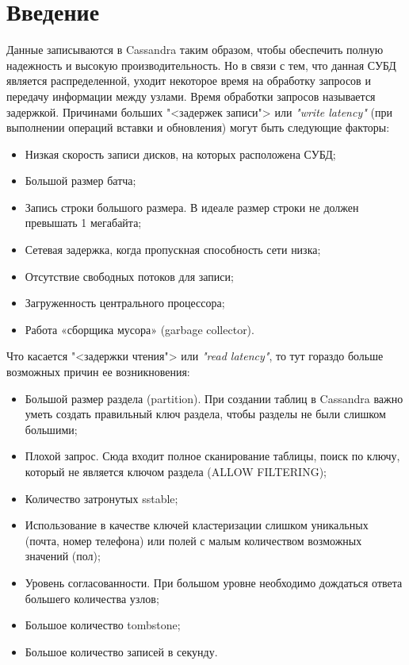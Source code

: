 \graphicspath{{img}} %
\section*{\LARGE Введение}

Данные записываются в Cassandra таким образом, чтобы обеспечить
полную надежность и высокую производительность. Но в связи с тем, что данная
СУБД является распределенной, уходит некоторое время на обработку запросов
и передачу информации между узлами. Время обработки запросов называется
задержкой. Причинами больших "<задержек записи"> или \textit{"write latency"}
(при выполнении операций вставки и обновления) могут быть следующие факторы:

\begin{itemize}
	\item Низкая скорость записи дисков, на которых расположена СУБД;
	\item Большой размер батча;
	\item Запись строки большого размера. В идеале размер строки не должен
	превышать 1 мегабайта;
	\item Сетевая задержка, когда пропускная способность сети низка;
	\item Отсутствие свободных потоков для записи;
	\item Загруженность центрального процессора;
	\item Работа «сборщика мусора» (garbage collector).
\end{itemize}

Что касается "<задержки чтения"> или \textit{"read latency"},
то тут гораздо больше возможных причин ее возникновения:

\begin{itemize}
	\item Большой размер раздела (partition). При создании таблиц в
	Cassandra важно уметь создать правильный ключ раздела, чтобы разделы не
	были слишком большими;
	\item Плохой запрос. Сюда входит полное сканирование таблицы, поиск
	по ключу, который не является ключом раздела (ALLOW FILTERING);
	\item Количество затронутых sstable;
	\item Использование в качестве ключей кластеризации слишком
	уникальных (почта, номер телефона) или полей с малым количеством
	возможных значений (пол);
	\item Уровень согласованности. При большом уровне необходимо
	дождаться ответа большего количества узлов;
	\item Большое количество tombstone;
	\item Большое количество записей в секунду.
\end{itemize}

